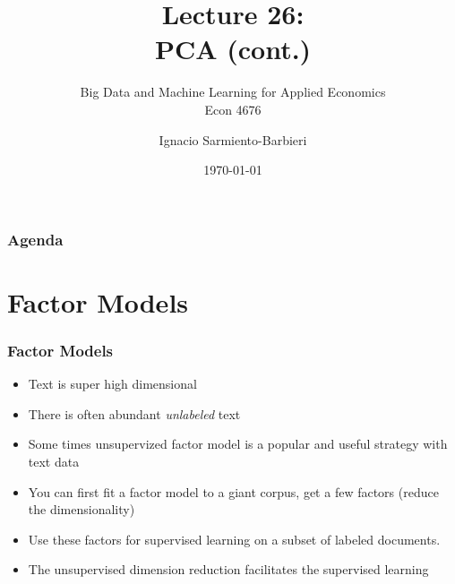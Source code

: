 \documentclass[
  shownotes,
  xcolor={svgnames},
  hyperref={colorlinks,citecolor=DarkBlue,linkcolor=DarkRed,urlcolor=DarkBlue}
  , aspectratio=169]{beamer}
\begin{document}
\title[Lecture 26]{Lecture 26: \\ PCA (cont.) }
\subtitle{Big Data and Machine Learning for Applied Economics \\ Econ 4676}
\date{\today}

\author[Sarmiento-Barbieri]{Ignacio Sarmiento-Barbieri}


\begin{frame}[noframenumbering]
\maketitle
\end{frame}







\begin{frame}
\frametitle{Agenda}

\tableofcontents

\end{frame}

\section{Factor Models}


\begin{frame}
\frametitle{Factor Models}

\begin{itemize}
\item Text is super high dimensional
\medskip
\item There is often abundant {\it unlabeled} text
\medskip
\item Some times unsupervized factor model is a popular and useful strategy with text data
\medskip
\item You can first fit a factor model to a giant corpus, get a few factors (reduce the dimensionality)
\medskip
\item Use these factors for supervised learning on a subset of labeled documents.
\medskip
\item The unsupervised dimension reduction facilitates the supervised learning
\end{itemize}
\end{frame}
\end{document}
